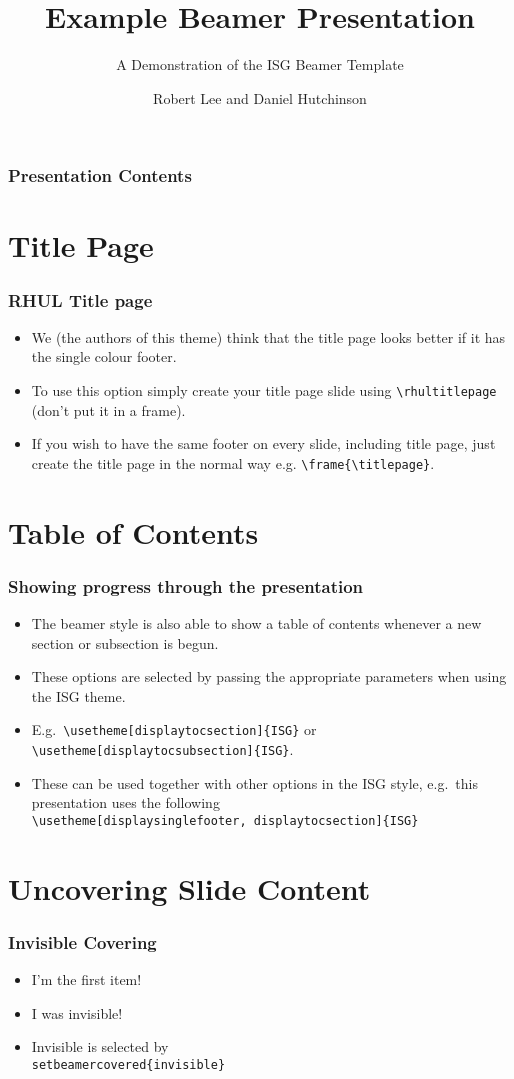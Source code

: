 \documentclass[]{beamer}
\title{Example Beamer Presentation}
\subtitle{A Demonstration of the ISG Beamer Template}
\author[R. Lee \& D. Hutchinson]{Robert Lee and Daniel Hutchinson}
\institute{Information Security Group,\\
Royal Holloway}
\begin{document}
\rhultitlepage

\begin{frame}\frametitle{Presentation Contents}
	\tableofcontents
\end{frame}

\section{Title Page}
\begin{frame}\frametitle{RHUL Title page}
\begin{itemize}
	\item We (the authors of this theme) think that the title page looks better if it has the single colour footer.
	\item To use this option simply create your title page slide using \texttt{\textbackslash rhultitlepage} (don't put it in a frame).
	\item If you wish to have the same footer on every slide, including title page, just create the title page in the normal way e.g. \texttt{\textbackslash frame\{\textbackslash titlepage\}}.
\end{itemize}
\end{frame}

\section{Table of Contents}
\begin{frame}\frametitle{Showing progress through the presentation}
\begin{itemize}
	\item The beamer style is also able to show a table of contents whenever a new section or subsection is begun.
	\item These options are selected by passing the appropriate parameters when using the ISG theme.
	\item E.g.\ \texttt{\textbackslash usetheme[displaytocsection]\{ISG\}} or \texttt{\textbackslash usetheme[displaytocsubsection]\{ISG\}}.
	\item These can be used together with other options in the ISG style, e.g.\ this presentation uses the following\\ {\scriptsize\texttt{\textbackslash usetheme[displaysinglefooter, displaytocsection]\{ISG\}}}
\end{itemize}
\end{frame}

\section{Uncovering Slide Content}
\begin{frame}\frametitle{Invisible Covering}
\begin{itemize}
	\item I'm the first item!
	\pause
	\item I was invisible!
	\pause
	\item Invisible is selected by \texttt{\\setbeamercovered\{invisible\}}
\end{itemize}
\end{frame}
\end{document}
